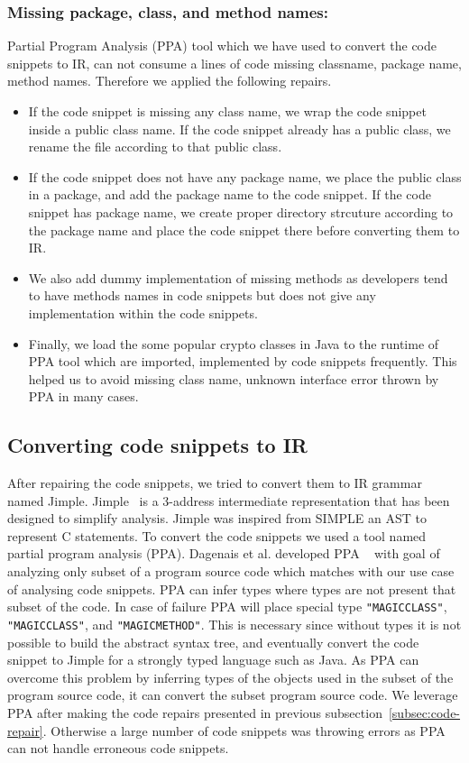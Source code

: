 \subsubsection{Missing package, class, and method names:}
Partial Program Analysis (PPA) tool which we have used to convert the code snippets to IR, can not consume a lines  of code missing classname,
 package name, method names. Therefore we applied the following repairs. 
\begin{itemize}
\item If the code snippet is missing any class name, we wrap the code snippet inside a public class name. If the code snippet already 
has a public class, we rename the file according to that public class.
\item If the code snippet does not have any package name, we place the public class in a package, and add the package name to the code snippet. 
If the code snippet has package name, we create proper directory strcuture according to the package name and place the code snippet there before converting them to IR. 
\item We also add dummy implementation of missing methods as developers tend to have methods names  in code snippets but does not give any implementation 
within the code snippets.
\item Finally, we load the some popular crypto classes in Java to the runtime of PPA tool which are imported, implemented by code snippets frequently. 
This helped us to avoid missing class name, unknown interface error thrown by PPA in many cases.  
 
\end{itemize}
       
\subsection{Converting code snippets to IR}
\label{subsec:converting-to-IR}

After repairing the code snippets, we tried to convert them to IR grammar named Jimple. Jimple~\cite{vallee1998jimple} 
is a 3-address intermediate representation that has been designed to simplify analysis. Jimple was inspired from SIMPLE an AST to represent C statements. 
To convert the code snippets we used a tool named partial program analysis (PPA). Dagenais et al. developed PPA ~\cite{dagenais2008enabling} 
with goal of analyzing only subset of a program source code which matches with our use case of analysing code snippets. PPA  can infer 
types where types are not present that subset of the code. In case of failure PPA will place special type \texttt{"MAGICCLASS"}, 
\texttt{"MAGICCLASS"}, and \texttt{"MAGICMETHOD"}. This is necessary since without types it is not possible to build the abstract syntax tree,
 and eventually convert the code snippet to Jimple for a strongly typed language such as Java. As PPA can overcome this problem by inferring 
 types of the objects used in the subset of the program source code, it can convert the subset program source code. We leverage PPA after 
 making the code repairs presented in previous subsection~\ref{subsec:code-repair}. Otherwise a large number of code snippets was throwing 
 errors as PPA can not handle erroneous code snippets.     

